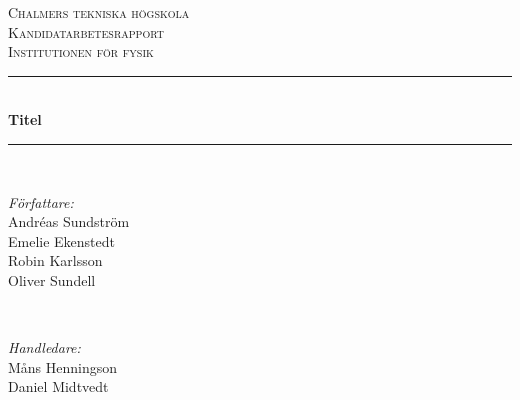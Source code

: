 
\newcommand{\andsunds}{andsunds@student.chalmers.se}
\newcommand{\emeeke}{emeeke@student.chalmers.se}
\newcommand{\robka}{robka@student.chalmers.se}
\newcommand{\soliver}{soliver@student.chalmers.se}


\begin{titlepage}

\newcommand{\HRule}{\rule{\linewidth}{0.5mm}} %

\center %
 

\textsc{\LARGE Chalmers tekniska högskola}\\[1.5cm] %
\textsc{\Large Kandidatarbetesrapport}\\[0.2cm] %
\textsc{\large Institutionen för fysik }\\[0.5cm] %


\HRule \\[0.4cm]
{ \huge \bfseries Titel}\\[0.4cm] %
\HRule \\[1.5cm]
 

\begin{minipage}{0.4\textwidth}
\begin{flushleft} \large
\emph{Författare:}\\
Andréas Sundström\footnotemark{} \\
Emelie Ekenstedt\footnotemark{} \\
Robin Karlsson\footnotemark{} \\
Oliver Sundell\footnotemark{}
\end{flushleft}
\end{minipage}
~
\begin{minipage}{0.4\textwidth}
\begin{flushright} \large
\emph{Handledare:} \\
Måns Henningson\\
Daniel Midtvedt
\end{flushright}
\end{minipage}\\[3cm]


\end{titlepage}
